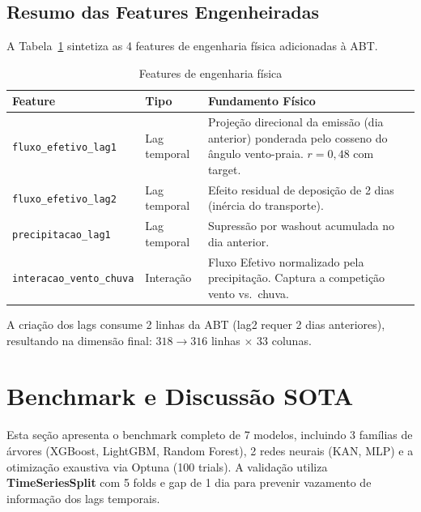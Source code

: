 \documentclass[12pt, a4paper]{article}
\newcommand{\feature}[1]{\texttt{#1}}
\begin{document}
\subsection{Resumo das Features Engenheiradas}

A Tabela~\ref{tab:features_eng} sintetiza as 4 features de engenharia
física adicionadas à ABT.

\begin{table}[H]
\centering
\caption{Features de engenharia física}
\label{tab:features_eng}
\begin{tabular}{@{}llp{6cm}@{}}
\toprule
\textbf{Feature} & \textbf{Tipo} & \textbf{Fundamento Físico} \\
\midrule
\feature{fluxo\_efetivo\_lag1} & Lag temporal &
    Projeção direcional da emissão (dia anterior) ponderada
    pelo cosseno do ângulo vento-praia. $r = 0{,}48$ com target. \\
\feature{fluxo\_efetivo\_lag2} & Lag temporal &
    Efeito residual de deposição de 2 dias (inércia do transporte). \\
\feature{precipitacao\_lag1} & Lag temporal &
    Supressão por washout acumulada no dia anterior. \\
\feature{interacao\_vento\_chuva} & Interação &
    Fluxo Efetivo normalizado pela precipitação.
    Captura a competição vento vs.\ chuva. \\
\bottomrule
\end{tabular}
\end{table}

A criação dos lags consume 2 linhas da ABT (lag2 requer 2 dias
anteriores), resultando na dimensão final: $318 \to 316$ linhas
$\times$ 33 colunas.

\newpage
\section{Benchmark e Discussão SOTA}
\label{sec:benchmark}

Esta seção apresenta o benchmark completo de 7 modelos, incluindo
3 famílias de árvores (XGBoost, LightGBM, Random Forest), 2 redes
neurais (KAN, MLP) e a otimização exaustiva via Optuna (100 trials).
A validação utiliza \textbf{TimeSeriesSplit} com 5 folds e gap de 1
dia para prevenir vazamento de informação dos lags temporais.
\end{document}
